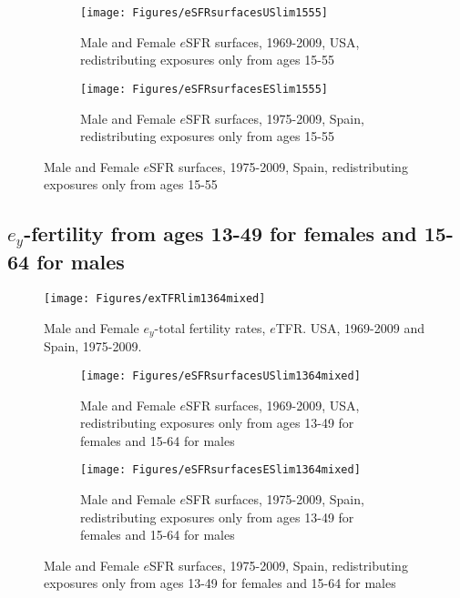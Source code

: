 \label{sec:1555}
\begin{figure}[ht!]
        \centering
        \begin{subfigure}
                \centering
                \caption{Male and Female $e$SFR surfaces, 1969-2009, USA,
                redistributing exposures only from ages 15-55}
                \texttt{[image: Figures/eSFRsurfacesUSlim1555]}
                \label{fig:exSFRsurfUSlim15_55}
        \end{subfigure}
        \begin{subfigure}
                \centering
                \caption{Male and Female $e$SFR surfaces, 1975-2009, Spain,
                redistributing exposures only from ages 15-55}
                \texttt{[image: Figures/eSFRsurfacesESlim1555]} 
                \label{fig:exSFRsurfESlim15_55}
        \end{subfigure}
\end{figure}

\FloatBarrier

\subsection{$e_y$-fertility from ages 13-49 for females and 15-64 for males}

\begin{figure}[ht!]
        \centering  
          \caption{Male and Female $e_y$-total fertility rates, $e$TFR. USA, 1969-2009 and Spain, 1975-2009.}
           \texttt{[image: Figures/exTFRlim1364mixed]}
          \label{fig:exTFRlim13_64}
\end{figure}

\label{sec:1364}
\begin{figure}[ht!]
        \centering
        \begin{subfigure}
                \centering
                \caption{Male and Female $e$SFR surfaces, 1969-2009, USA,
                redistributing exposures only from ages 13-49 for females and 15-64 for males}
                \texttt{[image: Figures/eSFRsurfacesUSlim1364mixed]}
                \label{fig:exSFRsurfUSlim1364}
        \end{subfigure}
        \begin{subfigure}
                \centering
                \caption{Male and Female $e$SFR surfaces, 1975-2009, Spain,
                redistributing exposures only from ages 13-49 for females and 15-64 for males}
                \texttt{[image: Figures/eSFRsurfacesESlim1364mixed]}
                \label{fig:exSFRsurfESlim1364}
        \end{subfigure}
\end{figure}


